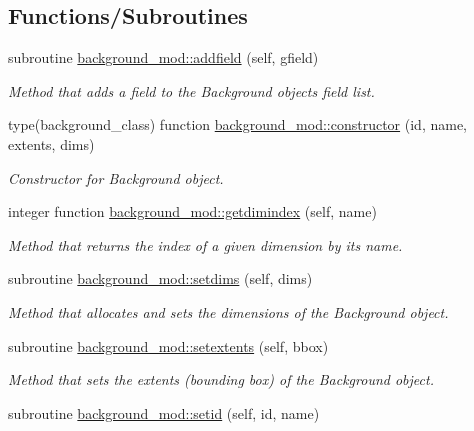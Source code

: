 \subsection*{Functions/\+Subroutines}
\begin{DoxyCompactItemize}
\item 
subroutine \mbox{\hyperlink{namespacebackground__mod_aa6ddc308698724f00ce1177ded5afc4c}{background\+\_\+mod\+::addfield}} (self, gfield)
\begin{DoxyCompactList}\small\item\em Method that adds a field to the Background object\textquotesingle{}s field list. \end{DoxyCompactList}\item 
type(background\+\_\+class) function \mbox{\hyperlink{namespacebackground__mod_ad0096fb6a5a11854fd70a7ce58dc3000}{background\+\_\+mod\+::constructor}} (id, name, extents, dims)
\begin{DoxyCompactList}\small\item\em Constructor for Background object. \end{DoxyCompactList}\item 
integer function \mbox{\hyperlink{namespacebackground__mod_a4e05d8be917e0143fe5889f2b19b750d}{background\+\_\+mod\+::getdimindex}} (self, name)
\begin{DoxyCompactList}\small\item\em Method that returns the index of a given dimension by it\textquotesingle{}s name. \end{DoxyCompactList}\item 
subroutine \mbox{\hyperlink{namespacebackground__mod_a06d96d4627391d74feb105a842a87dc0}{background\+\_\+mod\+::setdims}} (self, dims)
\begin{DoxyCompactList}\small\item\em Method that allocates and sets the dimensions of the Background object. \end{DoxyCompactList}\item 
subroutine \mbox{\hyperlink{namespacebackground__mod_ae8871564866fdd657a25f6a5a2256c33}{background\+\_\+mod\+::setextents}} (self, bbox)
\begin{DoxyCompactList}\small\item\em Method that sets the extents (bounding box) of the Background object. \end{DoxyCompactList}\item 
subroutine \mbox{\hyperlink{namespacebackground__mod_a4feaccf688558d8590ece4f09c65c977}{background\+\_\+mod\+::setid}} (self, id, name)

\end{DoxyCompactItemize}
